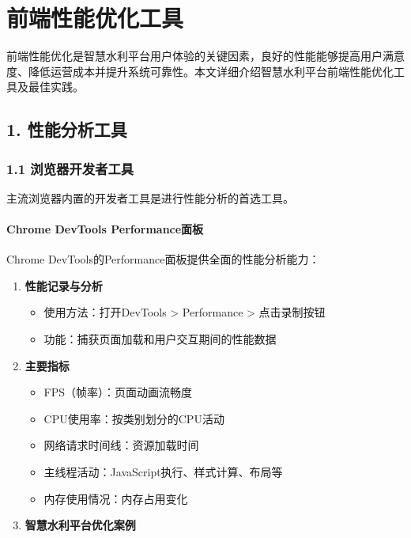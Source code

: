 \section{前端性能优化工具}\label{ux524dux7aefux6027ux80fdux4f18ux5316ux5de5ux5177}

前端性能优化是智慧水利平台用户体验的关键因素，良好的性能能够提高用户满意度、降低运营成本并提升系统可靠性。本文详细介绍智慧水利平台前端性能优化工具及最佳实践。

\subsection{1. 性能分析工具}\label{ux6027ux80fdux5206ux6790ux5de5ux5177}

\subsubsection{1.1
浏览器开发者工具}\label{ux6d4fux89c8ux5668ux5f00ux53d1ux8005ux5de5ux5177}

主流浏览器内置的开发者工具是进行性能分析的首选工具。

\paragraph{Chrome DevTools
Performance面板}\label{chrome-devtools-performanceux9762ux677f}

Chrome DevTools的Performance面板提供全面的性能分析能力：

\begin{enumerate}
\def\labelenumi{\arabic{enumi}.}
\tightlist
\item
  \textbf{性能记录与分析}

  \begin{itemize}
  \tightlist
  \item
    使用方法：打开DevTools \textgreater{} Performance \textgreater{}
    点击录制按钮
  \item
    功能：捕获页面加载和用户交互期间的性能数据
  \end{itemize}
\item
  \textbf{主要指标}

  \begin{itemize}
  \tightlist
  \item
    FPS（帧率）：页面动画流畅度
  \item
    CPU使用率：按类别划分的CPU活动
  \item
    网络请求时间线：资源加载时间
  \item
    主线程活动：JavaScript执行、样式计算、布局等
  \item
    内存使用情况：内存占用变化
  \end{itemize}
\item
  \textbf{智慧水利平台优化案例}
\end{enumerate}

